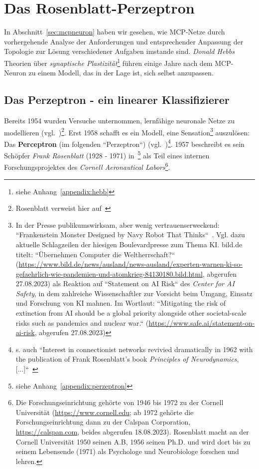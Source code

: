 \section{Das Rosenblatt-Perzeptron}

In Abschnitt~\ref{sec:mcpneuron} haben wir gesehen, wie MCP-Netze durch vorhergehende Analyse der Anforderungen und entsprechender Anpassung der Topologie zur Lösung verschiedener Aufgaben imstande sind.
\textit{Donald Hebbs} Theorien über \textit{synaptische Plastizität}\footnote{
    siehe Anhang~\ref{appendix:hebb}
} führen einige Jahre nach dem MCP-Neuron zu einem Modell, das in der Lage ist, sich selbst anzupassen.


\subsection{Das Perzeptron - ein linearer Klassifizierer}

Bereits 1954 wurden Versuche unternommen, lernfähige neuronale Netze zu modellieren (vgl.~\cite[24]{Ros62})\footnote{
    Rosenblatt verweist hier auf~\cite{FC54}
}.
Erst 1958 schafft es ein Modell, eine Sensation\footnote{
    In der Presse publikumswirksam, aber wenig vertrauenserweckend: ``Frankenstein Monster Designed by Navy Robot That Thinks``~\cite[v]{Ros62}. Vgl. dazu aktuelle Schlagzeilen der hiesigen Boulevardpresse zum Thema KI. bild.de titelt: ``Übernehmen Computer die Weltherrschaft{?}`` (\url{https://www.bild.de/news/ausland/news-ausland/experten-warnen-ki-so-gefaehrlich-wie-pandemien-und-atomkrieg-84130180.bild.html}, abgerufen 27.08.2023) als Reaktion auf ``Statement on AI Risk`` des \textit{Center for AI Safety}, in dem zahlreiche Wissenschaftler zur Vorsicht beim Umgang, Einsatz und Forschung von KI mahnen. Im Wortlaut: ``Mitigating the risk of extinction from AI should be a global priority alongside other societal-scale risks such as pandemics and nuclear war.`` (\url{https://www.safe.ai/statement-on-ai-risk}, abgerufen 27.08.2023)
} auszulösen: Das \textbf{Perceptron} (im folgenden ``Perzeptron``) (vgl.~\cite[89]{AR88})\footnote{
    s. auch ``Interest in connectionist networks revivied dramatically in 1962 with the publication of Frank Rosenblatt's book \textit{Principles of Neurodynamics}, [...]``~\cite[xi, Hervorhebung i.O.]{MP88}
}.
1957 beschreibt es sein Schöpfer \textit{Frank Rosenblatt} (1928 - 1971) in~\cite{Ros57}\footnote{
    siehe Anhang~\ref{appendix:perzeptron}
} als Teil eines internen Forschungsprojektes des \textit{Cornell Aeronautical Labors}\footnote{
    Die Forschungseinrichtung gehörte von 1946 bis 1972 zu der Cornell Universität (\url{https://www.cornell.edu}; ab 1972 gehörte die Forschungseinrichtung dann zu der Calspan Corporation, \url{https://calspan.com}, beides abgerufen 18.08.2023). Rosenblatt macht an der Cornell Universität 1950 seinen A.B, 1956 seinen Ph.D. und wird dort bis zu seinem Lebensende (1971) als Psychologe und Neurobiologe forschen und lehren.
}.

